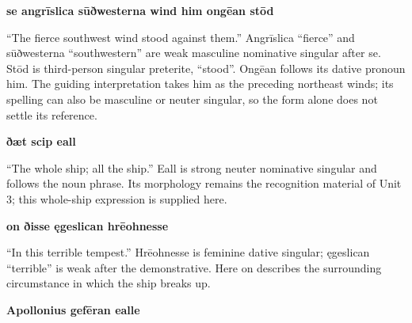 \textbf{se angrīslica sūðwesterna wind him ongēan stōd}

“The fierce southwest wind stood against them.” Angrīslica “fierce” and sūðwesterna “southwestern” are weak masculine nominative singular after se. Stōd is third-person singular preterite, “stood”. Ongēan follows its dative pronoun him. The guiding interpretation takes him as the preceding northeast winds; its spelling can also be masculine or neuter singular, so the form alone does not settle its reference.

\textbf{ðæt scip eall}

“The whole ship; all the ship.” Eall is strong neuter nominative singular and follows the noun phrase. Its morphology remains the recognition material of Unit 3; this whole-ship expression is supplied here.

\textbf{on ðisse ęgeslican hrēohnesse}

“In this terrible tempest.” Hrēohnesse is feminine dative singular; ęgeslican “terrible” is weak after the demonstrative. Here on describes the surrounding circumstance in which the ship breaks up.

\textbf{Apollonius gefēran ealle}

